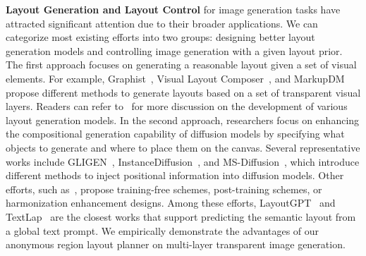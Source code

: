 \noindent\textbf{Layout Generation and Layout Control} for image generation tasks have attracted significant attention due to their broader applications. We can categorize most existing efforts into two groups: designing better layout generation models and controlling image generation with a given layout prior.
The first approach focuses on generating a reasonable layout given a set of visual elements. For example, Graphist~\cite{cheng2024graphic}, Visual Layout Composer~\cite{shabani2024visual}, and MarkupDM~\cite{kikuchi2024multimodal} propose different methods to generate layouts based on a set of transparent visual layers. Readers can refer to~\cite{feng2024layoutgpt,yamaguchi2021canvasvae,inoue2023layoutdm,chai2023layoutdm,hui2023unifying,kong2022blt,cheng2023play,tang2023layoutnuwa,jiang2022coarse,jiang2023layoutformer++,weng2024desigen,wang2023dolfin,guerreiro2025layoutflow,yang2024posterllava,inoue2023towards,chen2024textlap,fontanella2024generating,braunstein2024slayr} for more discussion on the development of various layout generation models.
In the second approach, researchers focus on enhancing the compositional generation capability of diffusion models by specifying what objects to generate and where to place them on the canvas. Several representative works include GLIGEN~\cite{li2023gligen}, InstanceDiffusion~\cite{wang2024instancediffusion}, and MS-Diffusion~\cite{wang2024msdiffusion}, which introduce different methods to inject positional information into diffusion models. Other efforts, such as~\cite{bar2023multidiffusion,yang2024mastering,kim2023dense,omost,sarukkai2024collage,zhang2024itercomp}, propose training-free schemes, post-training schemes, or harmonization enhancement designs. Among these efforts, LayoutGPT~\cite{feng2024layoutgpt} and TextLap~\cite{chen2024textlap} are the closest works that support predicting the semantic layout from a global text prompt. We empirically demonstrate the advantages of our anonymous region layout planner on multi-layer transparent image generation.